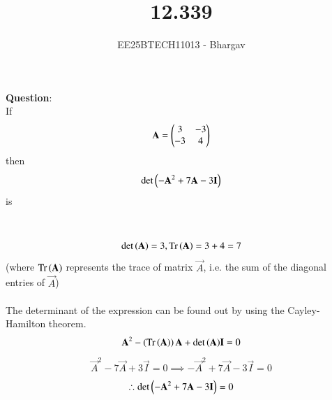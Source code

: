 \documentclass[journal]{IEEEtran}
\DeclareMathOperator{\Tr}{Tr}
\begin{document}

\vspace{3cm}

\title{12.339}
\author{EE25BTECH11013 - Bhargav}
\maketitle
    {\let\newpage\relax\maketitle}

\renewcommand{\thefigure}{\theenumi}
\renewcommand{\thetable}{\theenumi}
\setlength{\intextsep}{10pt} %

\renewcommand{\thetable}{\theenumi}

\textbf{Question}: \\
If
\begin{align}
\mathbf{A} = \begin{pmatrix}3 & -3 \\ -3 & 4\end{pmatrix}
\end{align}
then 
\begin{align}
\det{\ensuremath{\left(-\mathbf{A}^2 + 7\mathbf{A} - 3\mathbf{I}\right)}}
\end{align}
is \\ \\
\solution \\
\begin{align}
\det{\brak{\vec{A}}} = 3, \Tr{\brak{\vec{A}}} = 3 + 4 = 7
\end{align}
(where $\Tr{\brak{\vec{A}}}$ represents the trace of matrix $\vec{A}$, i.e. the sum of the diagonal entries of $\vec{A}$) \\ \\ 

The determinant of the expression can be found out by using the Cayley-Hamilton theorem.\\
\begin{align}
\vec{A}^2 - \brak{\Tr{\brak{\vec{A}}}}\vec{A} + \det{\brak{\vec{A}}}\vec{I} = 0 
\end{align}
\begin{align}
\vec{A}^2 - 7\vec{A} + 3\vec{I} = 0 \implies -\vec{A}^2 + 7\vec{A} - 3\vec{I} = 0
\end{align}
\begin{align}
\therefore \det{\ensuremath{\left(-\mathbf{A}^2 + 7\mathbf{A} - 3\mathbf{I}\right)}} = 0
\end{align}
\end{document}
